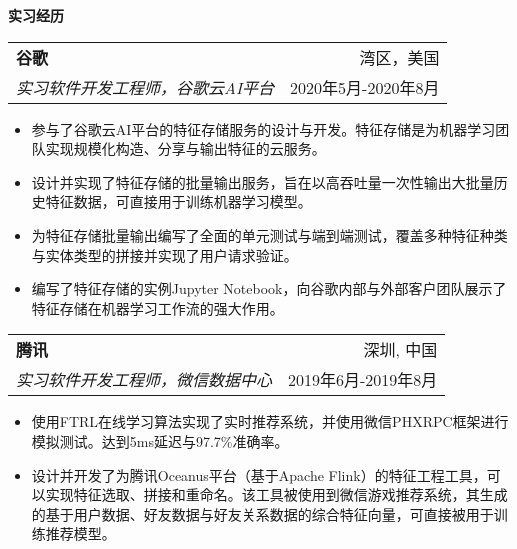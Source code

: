 \documentclass[letterpaper,11pt]{article}
\makeatletter
\newcommand{\resitem}[1]{\item  #1}
\newcommand{\resheading}[1]{{\large \colorbox{mygrey}{\begin{minipage}{\linewidth}{\textbf{#1 \vphantom{p\^{E}}}}\end{minipage}}}}
\newcommand{\ressubheading}[4]{
\begin{tabular*}{1.04\linewidth}{l@{\extracolsep{\fill}}r}
		\textbf{#1} & #2 \\
		\textit{#3} & #4 \\
\end{tabular*}\vspace{-6pt}}
\makeatother
\begin{document}
\resheading{实习经历}
	\begin{description}
		\item 
			\ressubheading{谷歌}{湾区，美国}
				{实习软件开发工程师，谷歌云AI平台}{2020年5月-2020年8月}
				{ \footnotesize
				\begin{itemize}
					\resitem{参与了谷歌云AI平台的特征存储服务的设计与开发。特征存储是为机器学习团队实现规模化构造、分享与输出特征的云服务。}
					\resitem{设计并实现了特征存储的批量输出服务，旨在以高吞吐量一次性输出大批量历史特征数据，可直接用于训练机器学习模型。}
					\resitem{为特征存储批量输出编写了全面的单元测试与端到端测试，覆盖多种特征种类与实体类型的拼接并实现了用户请求验证。}
					\resitem{编写了特征存储的实例Jupyter Notebook，向谷歌内部与外部客户团队展示了特征存储在机器学习工作流的强大作用。}	
				\end{itemize}
				}
		\item 
			\ressubheading{腾讯}{深圳, 中国}
				{实习软件开发工程师，微信数据中心}{2019年6月-2019年8月}
				{ \footnotesize
				\begin{itemize}
					\resitem{使用FTRL在线学习算法实现了实时推荐系统，并使用微信PHXRPC框架进行模拟测试。达到5ms延迟与97.7\%准确率。}
					\resitem{设计并开发了为腾讯Oceanus平台（基于Apache Flink）的特征工程工具，可以实现特征选取、拼接和重命名。该工具被使用到微信游戏推荐系统，其生成的基于用户数据、好友数据与好友关系数据的综合特征向量，可直接被用于训练推荐模型。}
				\end{itemize}
				}
	\end{description}  %
\end{document}
